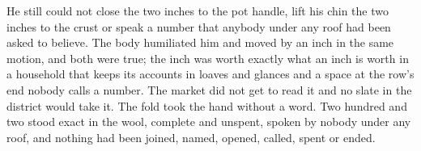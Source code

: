 He still could not close the two inches to the pot handle, lift his chin the two inches to the crust or speak a number that anybody under any roof had been asked to believe. The body humiliated him and moved by an inch in the same motion, and both were true; the inch was worth exactly what an inch is worth in a household that keeps its accounts in loaves and glances and a space at the row's end nobody calls a number. The market did not get to read it and no slate in the district would take it. The fold took the hand without a word. Two hundred and two stood exact in the wool, complete and unspent, spoken by nobody under any roof, and nothing had been joined, named, opened, called, spent or ended.
